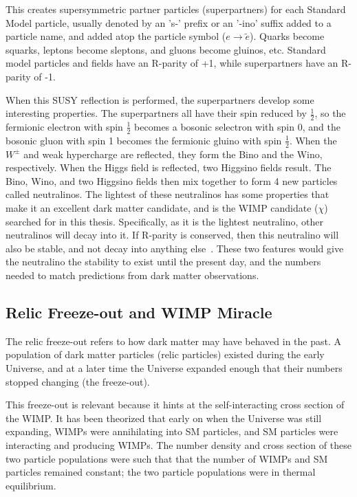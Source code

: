 This creates supersymmetric partner particles (superpartners) for each Standard Model particle, usually denoted by an 's-' prefix or an '-ino' suffix added to a particle name, and \nicetilde{} added atop the particle symbol ($e \rightarrow \tilde{e}$).
Quarks become squarks, leptons become sleptons, and gluons become gluinos, etc.
Standard model particles and fields have an R-parity of +1, while superpartners have an R-parity of -1.

When this SUSY reflection is performed, the superpartners develop some interesting properties.
The superpartners all have their spin reduced by $\frac{1}{2}$, so the fermionic electron with spin $\frac{1}{2}$ becomes a bosonic selectron with spin $0$, and the bosonic gluon with spin 1 becomes the fermionic gluino with spin $\frac{1}{2}$.
When the $W^{\pm}$  and weak hypercharge are reflected, they form the Bino and the Wino, respectively.
When the Higgs field is reflected, two Higgsino fields result.
The Bino, Wino, and two Higgsino fields then mix together to form 4 new particles called neutralinos.
The lightest of these neutralinos has some properties that make it an excellent dark matter candidate, and is the WIMP candidate ($\chi$) searched for in this thesis.
Specifically, as it is the lightest neutralino, other neutralinos will decay into it.
If R-parity is conserved, then this neutralino will also be stable, and not decay into anything else~\cite{neutralino1,neutralino2,neutralino3}.
These two features would give the neutralino the stability to exist until the present day, and the numbers needed to match predictions from dark matter observations.

\subsection{Relic Freeze-out and WIMP Miracle}

The relic freeze-out refers to how dark matter may have behaved in the past.
A population of dark matter particles (relic particles) existed during the early Universe, and at a later time the Universe expanded enough that their numbers stopped changing (the freeze-out).

This freeze-out is relevant because it hints at the self-interacting cross section of the WIMP.
It has been theorized that early on when the Universe was still expanding, WIMPs were annihilating into SM particles, and SM particles were interacting and producing WIMPs.
The number density and cross section of these two particle populations were such that that the number of WIMPs and SM particles remained constant; the two particle populations were in thermal equilibrium.

